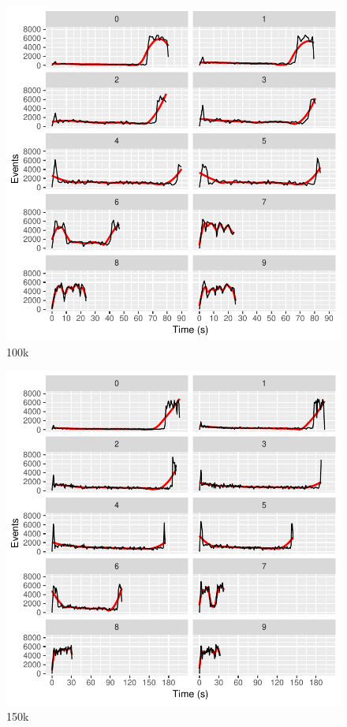 \begin{figure}[htb]
        \includegraphics[width=\textwidth]{gfx/config-comparison_100k.pdf}
        \caption{100k}
        \label{fig:evaluation:performance:config-comparison_100k}
\end{figure}

\begin{figure}[htb]
        \includegraphics[width=\textwidth]{gfx/config-comparison_150k.pdf}
        \caption{150k}
        \label{fig:evaluation:performance:config-comparison_150k}
\end{figure}


